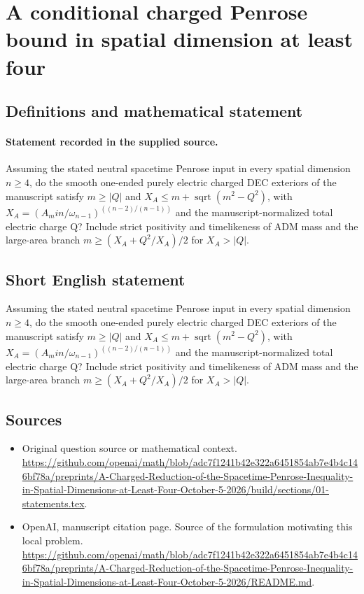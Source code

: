 \documentclass[11pt]{article}
\begin{document}
\section*{A conditional charged Penrose bound in spatial dimension at least four}\label{statement}
\subsection{Definitions and mathematical statement}
\paragraph{Statement recorded in the supplied source.}
Assuming the stated neutral spacetime Penrose input in every spatial dimension $n\geq 4$, do the smooth one-ended purely electric charged DEC exteriors of the manuscript satisfy $m\geq |Q|$ and $X_A\leq m+\operatorname{sqrt}(m^2-Q^2)$, with $X_A=(A_min/\omega _{n-1})^((n-2)/(n-1))$ and the manuscript-normalized total electric charge Q? Include strict positivity and timelikeness of ADM mass and the large-area branch $m\geq (X_A+Q^2/X_A)/2$ for $X_A>|Q|$.
\subsection{Short English statement}
Assuming the stated neutral spacetime Penrose input in every spatial dimension $n\geq 4$, do the smooth one-ended purely electric charged DEC exteriors of the manuscript satisfy $m\geq |Q|$ and $X_A\leq m+\operatorname{sqrt}(m^2-Q^2)$, with $X_A=(A_min/\omega _{n-1})^((n-2)/(n-1))$ and the manuscript-normalized total electric charge Q? Include strict positivity and timelikeness of ADM mass and the large-area branch $m\geq (X_A+Q^2/X_A)/2$ for $X_A>|Q|$.
\subsection{Sources}
\begin{itemize}
\item[S1] Original question source or mathematical context.
\url{https://github.com/openai/math/blob/adc7f1241b42e322a6451854ab7e4b4c146bf78a/preprints/A-Charged-Reduction-of-the-Spacetime-Penrose-Inequality-in-Spatial-Dimensions-at-Least-Four-October-5-2026/build/sections/01-statements.tex}.
\item[S2] OpenAI, manuscript citation page. Source of the formulation motivating this local problem.
\url{https://github.com/openai/math/blob/adc7f1241b42e322a6451854ab7e4b4c146bf78a/preprints/A-Charged-Reduction-of-the-Spacetime-Penrose-Inequality-in-Spatial-Dimensions-at-Least-Four-October-5-2026/README.md}.
\end{itemize}
\end{document}
